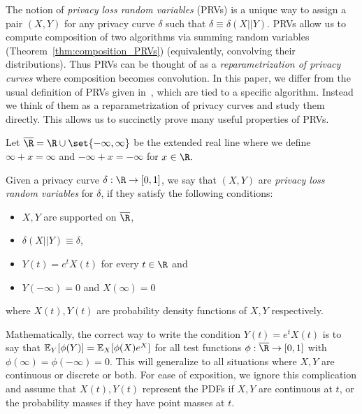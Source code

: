 
The notion of \emph{privacy loss random variables} (PRVs) is a unique way to assign a pair $(X,Y)$ for any privacy curve $\delta$ such that $\delta \equiv \delta(X||Y).$ PRVs allow us to compute composition of two algorithms via summing random variables (Theorem~\ref{thm:composition_PRVs}) (equivalently, convolving their distributions). Thus PRVs can be thought of as a \emph{reparametrization of privacy curves} where composition becomes convolution. In this paper, we differ from the usual definition of PRVs given in~\cite{DR16,koskela2020computing}, which are tied to a specific algorithm. Instead we think of them as a reparametrization of privacy curves and study them directly. This allows us to succinctly prove many useful properties of PRVs.

Let $\bR=\R\cup\set{-\infty,\infty}$ be the extended real line where we define $\infty+x=\infty$ and $-\infty+x=-\infty$ for $x\in \R.$


\begin{definition}
	Given a privacy curve $\delta:\R\to[0,1]$, we say that $(X,Y)$ are \emph{privacy loss random variables} for $
	\delta$, if they satisfy the following conditions:
	\begin{itemize}
	 	\item $X,Y$ are supported on $\bR$,
	 	\item $\delta(X||Y)\equiv \delta$,
	 	\item $Y(t)=e^t X(t)$ for every $t\in \R$ and
	 	\item $Y(-\infty)=0$ and $X(\infty)=0$
	 \end{itemize} 
	 where $X(t),Y(t)$ are probability density functions of $X,Y$ respectively.
\end{definition}
Mathematically, the correct way to write the condition $Y(t)=e^t X(t)$ is to say that $\operatorname{\mathbb{E}}_{Y}[\phi(Y)] = \operatorname{\mathbb{E}}_{X}[\phi(X)e^X]$ for all test functions $\phi:\bR \to [0,1]$ with $\phi(\infty)=\phi(-\infty)=0.$ This will generalize to all situations where $X,Y$ are continuous or discrete or both. 
For ease of exposition, we ignore this complication and assume that $X(t),Y(t)$ represent the PDFs if $X,Y$ are continuous at $t$, or the probability masses if they have point masses at $t$.




